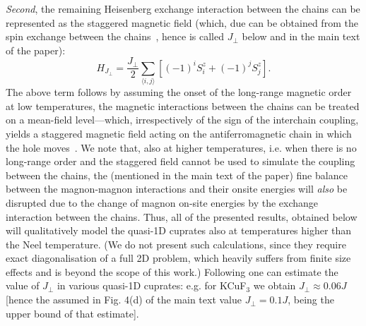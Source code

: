 \documentclass[%
 reprint,
 amsmath,amssymb,
 aps,
prl,
]{revtex4-1}
\newcommand{\mean}[1]{\langle#1\rangle}
\begin{document}
{\it Second}, the remaining Heisenberg exchange interaction between the chains 
can be represented as the staggered magnetic field (which, due can be obtained from the spin exchange between the chains~\cite{Schulz1996}, hence is called $J_\perp$ below and  in the main text of the paper):
\begin{equation}
	H_{J_\perp} = \frac{J_\perp}{2} \sum_{\mean{i,j}} \left[(-1)^i S^z_i + (-1)^j S^z_j\right].
	\label{eq:stag}
\end{equation}
The above term follows by assuming the onset of the long-range magnetic order at low temperatures, 
the magnetic interactions between the chains can be treated on a mean-field level---which, irrespectively of the sign of the interchain coupling,
yields a staggered magnetic field acting on the antiferromagnetic chain in which the hole moves~\cite{Schulz1996,
Essler1997, Sandvik1999}. We note that, also at higher temperatures, i.e. when there is no long-range order and the staggered field 
cannot be used to simulate the coupling between the chains, the (mentioned in the main text of the paper) 
fine balance between the magnon-magnon interactions and their onsite energies will {\it also} be disrupted due to the 
change of magnon on-site energies by the exchange interaction between the chains.
Thus, all of the presented results, obtained below will qualitatively model the quasi-1D cuprates also at temperatures higher than 
the Neel temperature. (We do not present such calculations, since they require exact diagonalisation 
of a full 2D problem, which heavily suffers from finite size effects and is beyond the scope of this work.)
Following \cite{Schulz1996} one can estimate the value of  $J_\perp$
in various quasi-1D cuprates: e.g. for KCuF$_3$ we obtain $J_\perp \approx 0.06 J$ [hence the assumed in Fig. 4(d) of the main text value $J_\perp =0.1J$, being
the upper bound of that estimate].
\end{document}
